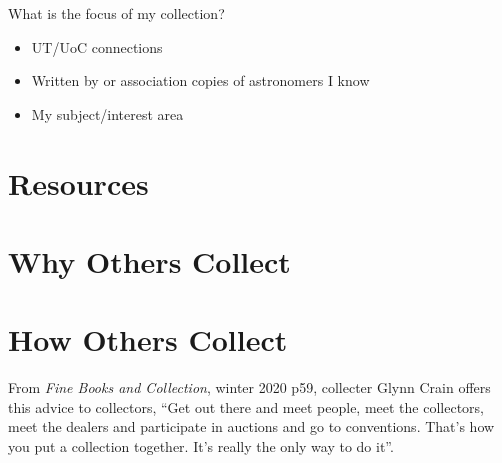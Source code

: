 \documentclass[letterpaper]{article}
\begin{document}
What is the focus of my collection?

\begin{itemize}
\item UT/UoC connections
\item Written by or association copies of astronomers I know
\item My subject/interest area
\end{itemize}

\section{Resources}

\section{Why Others Collect}

\section{How Others Collect}

From {\itshape Fine Books and Collection}, winter 2020 p59, collecter
Glynn Crain offers this advice to collectors, ``Get out there and meet
people, meet the collectors, meet the dealers and participate in
auctions and go to conventions. That's how you put a collection
together. It's really the only way to do it''.
\end{document}
